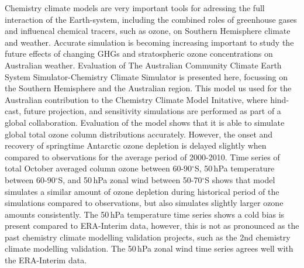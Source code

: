 Chemistry climate models are very important tools for adressing the full interaction of the Earth-system, including the combined roles of greenhouse gases and influencal chemical tracers, such as ozone, on Southern Hemisphere climate and weather. Accurate simulation is becoming increasing important to study the future effects of changing GHGs and stratospheric ozone concentrations on Australian weather. Evaluation of The Australian Community Climate Earth System Simulator-Chemistry Climate Simulator is presented here, focussing on the Southern Hemisphere and the Australian region. This model us used for the Australian contribution to the Chemistry Climate Model Initative, where hind-cast, future projection, and sensitivity simulations are performed as part of a global collaboration. Evaluation of the model shows that it is able to simulate global total ozone column distributions accurately. However, the onset and recovery of springtime Antarctic ozone depletion is delayed slightly when compared to observations for the average period of 2000-2010. Time series of total October averaged column ozone between 60-90$^\circ$S, 50\,hPa temperature between 60-90$^\circ$S, and 50\,hPa zonal wind between 50-70$^\circ$S shows that model simulates a similar amount of ozone depletion during historical period of the simulations compared to observations, but also simulates slightly larger ozone amounts consistently. The 50\,hPa temperature time series shows a cold bias is present compared to ERA-Interim data, however, this is not as pronounced as the past chemistry climate modelling validation projects, such as the 2nd chemistry climate modelling validation. The 50\,hPa zonal wind time series agrees well with the ERA-Interim data.
